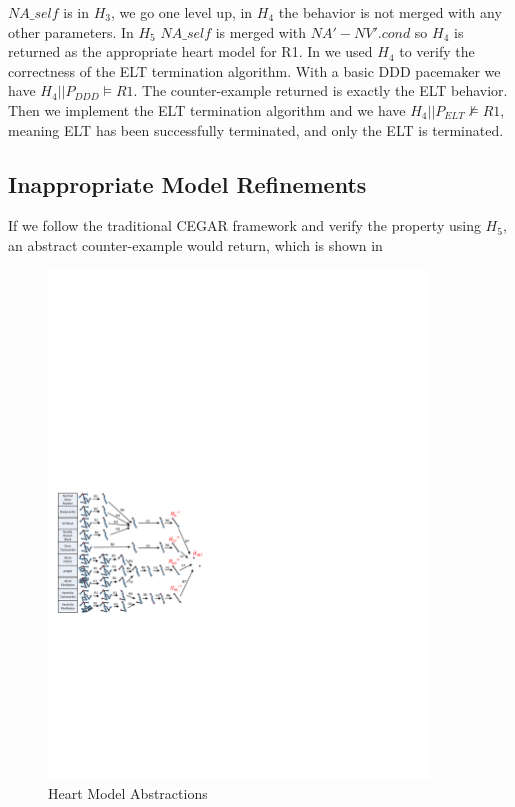 $NA\_self$ is in $H_3$, we go one level up, in $H_4$ the behavior is not merged with any other parameters. In $H_5$ $NA\_self$ is merged with  $NA'-NV'.cond$ so $H_4$ is returned as the appropriate heart model for R1. In \cite{STTT13} we used $H_4$ to verify the correctness of the ELT termination algorithm. With a basic DDD pacemaker we have $H_4 || P_{DDD}\models R1$. The counter-example returned is exactly the ELT behavior. Then we implement the ELT termination algorithm and we have  $H_4 || P_{ELT}\not\models R1$, meaning ELT has been successfully terminated, and only the ELT is terminated. 

\subsection{Inappropriate Model Refinements}
If we follow the traditional CEGAR framework and verify the property using $H_5$, an abstract counter-example would return, which is shown in %
 
\begin{figure}[!t]
		\centering
		\includegraphics[width=0.9\textwidth]{figs/abs.pdf}
		\caption{\small Heart Model Abstractions}
		\label{fig:HM_abs}
\end{figure}



